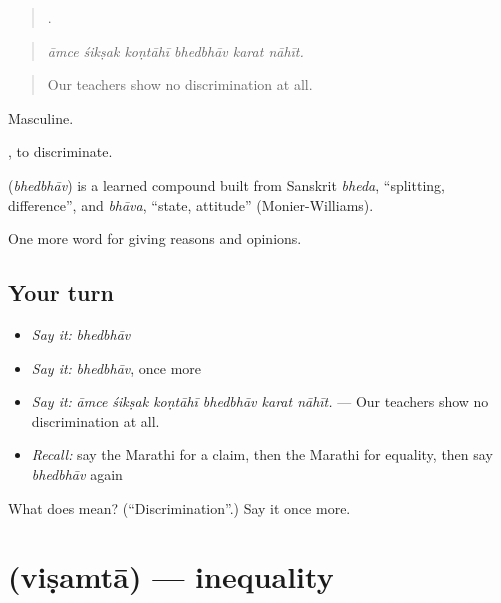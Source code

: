 \begin{quote}
     .
\end{quote}

\begin{quote}
\emph{āmce śikṣak koṇtāhī bhedbhāv karat nāhīt.}
\end{quote}

\begin{quote}
Our teachers show no discrimination at all.
\end{quote}

Masculine.

 , to discriminate.

\begin{cousinweb}
\textbf{} (\emph{bhedbhāv}) is a learned compound built from Sanskrit \emph{bheda}, \textquotedblleft{}splitting, difference\textquotedblright{}, and \emph{bhāva}, \textquotedblleft{}state, attitude\textquotedblright{} (Monier-Williams).
\end{cousinweb}

\begin{grammarlens}[title={What you've built}]
One more word for giving reasons and opinions.
\end{grammarlens}

\subsection*{Your turn}
\begin{itemize}
\raggedright
  \item \emph{Say it:} \emph{bhedbhāv}
  \item \emph{Say it:} \emph{bhedbhāv}, once more
  \item \emph{Say it:} \emph{āmce śikṣak koṇtāhī bhedbhāv karat nāhīt.} — Our teachers show no discrimination at all.
  \item \emph{Recall:} say the Marathi for a claim, then the Marathi for equality, then say \emph{bhedbhāv} again
\end{itemize}

\begin{tcolorbox}[breakable,colback=teal!4,colframe=teal!35!black,title={Before you move on}]
What does  mean? (\textquotedblleft{}Discrimination\textquotedblright{}.) Say it once more.
\end{tcolorbox}
\section[\texorpdfstring{\mr{विषमता} (viṣamtā)}{विषमता (viṣamtā)}]{ (viṣamtā) — inequality}


